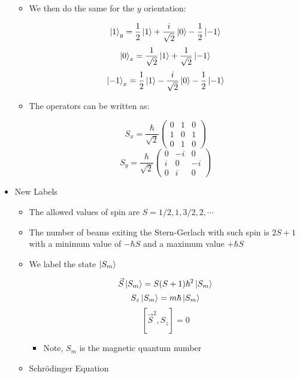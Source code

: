 \begin{itemize}
\begin{itemize}
        \item We then do the same for the $y$ orientation:

          $$\ket{1}_y=\frac{1}{2}\ket{1}+\frac{i}{\sqrt{2}}\ket{0}-\frac{1}{2}\ket{-1}$$
          $$\ket{0}_x=\frac{1}{\sqrt{2}}\ket{1}+\frac{1}{\sqrt{2}}\ket{-1}$$
          $$\ket{-1}_x=\frac{1}{2}\ket{1}-\frac{i}{\sqrt{2}}\ket{0}-\frac{1}{2}\ket{-1}$$

        \item The operators can be written as:

          $$S_x=\frac{\hbar}{\sqrt{2}}\left( \begin{matrix} 0 & 1 & 0\\ 1 & 0 & 1\\ 0 & 1 & 0\end{matrix} \right)$$
          $$S_y=\frac{\hbar}{\sqrt{2}}\left( \begin{matrix} 0 & -i & 0\\ i & 0 & -i\\ 0 & i & 0\end{matrix} \right)$$

    \end{itemize}

  \item New Labels

    \begin{itemize}

      \item The allowed values of spin are $S=1/2,1,3/2,2,\cdots$

      \item The number of beams exiting the Stern-Gerlach with such spin is $2S+1$ with a minimum value of $-\hbar S$ and a maximum value  $+\hbar S$

      \item We label the state $\ket{S_m}$

        $$\vec{S}\ket{S_m}=S(S+1)\hbar^2\ket{S_m}$$
        $$S_z\ket{S_m}=m\hbar\ket{S_m}$$
        $$[\vec{S}^2,S_z]=0$$

        \begin{itemize}

          \item Note, $S_m$ is the magnetic quantum number

        \end{itemize}

      \item Schr\"odinger Equation

        \begin{itemize}


\end{itemize}
\end{itemize}
\end{itemize}

